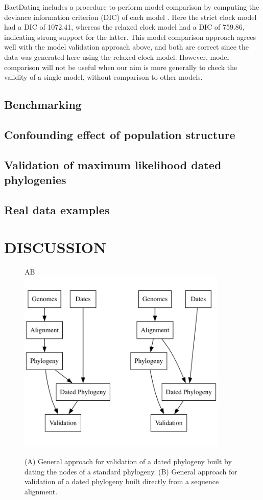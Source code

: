 \documentclass{article}
\begin{document}
BactDating includes a procedure to perform model comparison by computing
the deviance information criterion (DIC) of each model \citep{Spiegelhalter2002}.
Here the strict clock model had a DIC of 1072.41, whereas the relaxed clock model
had a DIC of 759.86, indicating strong support for the latter. 
This model comparison approach agrees well with the model validation approach above,
and both are correct since the data was generated here using the relaxed clock model.
However, model comparison
will not be useful when our aim is more generally to check the validity
of a single model, without comparison to other models.

\subsection*{Benchmarking}

\subsection*{Confounding effect of population structure}

\subsection*{Validation of maximum likelihood dated phylogenies}

\subsection*{Real data examples}

\section*{DISCUSSION}

\begin{figure}[p!]
\begin{center}
A\hspace*{6cm}B\hspace*{6cm}~\\
\includegraphics[width=10cm]{fig1.png}
\end{center}
\caption{(A) General approach for validation of a dated phylogeny built by dating the nodes of a standard phylogeny. (B) General approach for validation of a dated phylogeny built directly from a sequence alignment.
\label{fig:approach}}
\end{figure}
\end{document}
